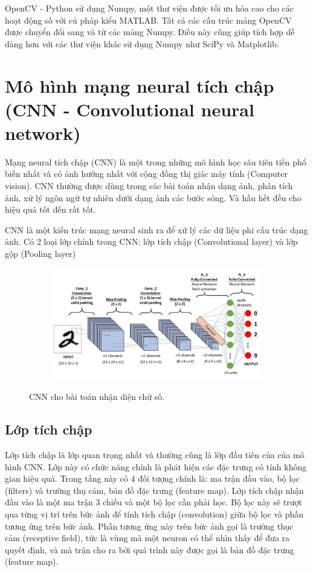 OpenCV - Python sử dụng Numpy, một thư viện được tối ưu hóa cao cho các hoạt động số với
cú pháp kiểu MATLAB. Tất cả các cấu trúc mảng OpenCV được chuyển đổi sang và từ các mảng
Numpy. Điều này cũng giúp tích hợp dễ dàng hơn với các thư viện khác sử dụng Numpy
như SciPy và Matplotlib.



\section{Mô hình mạng neural tích chập (CNN - Convolutional neural network)}

Mạng neural tích chập (CNN) là một trong những mô hình học sâu\cite{repec} tiên tiến phổ biến nhất và
có ảnh hưởng nhất với cộng đồng thị giác máy tính (Computer vision). CNN thường được dùng
trong các bài toán nhận dạng ảnh, phân tích ảnh, xử lý ngôn ngữ tự nhiên dưới dạng ảnh các bước sóng.
Và hầu hết đều cho hiệu quả tốt đến rất tốt.

CNN là một kiến trúc mạng neural sinh ra để xử lý các dữ liệu phi cấu trúc dạng ảnh. Có 2 loại lớp
chính trong CNN: lớp tích chập (Convolutional layer) và lớp gộp (Pooling layer)

\begin{figure}
    \begin{subfigure}{1.\textwidth}
        \includegraphics[width=1.\linewidth]{Chapters/items/cnn2_1.jpg}
        \label{fig: chap2_2}
    \end{subfigure}
    \caption{CNN cho bài toán nhận diện chữ số.}
\end{figure}
\subsection{Lớp tích chập}

Lớp tích chập là lớp quan trọng nhất và thường cũng là lớp đầu tiên của của mô hình CNN.
Lớp này có chức năng chính là phát hiện các đặc trưng có tính không gian hiệu quả.
Trong tầng này có 4 đối tượng chính là: ma trận đầu vào, bộ lọc (filters) và trường thụ cảm,
bản đồ đặc trưng (feature map). Lớp tích chập nhận đầu vào là một ma trận 3 chiều và một bộ lọc cần phải học.
Bộ lọc này sẽ trượt qua từng vị trí trên bức ảnh để tính tích chập (convolution)
giữa bộ lọc và phần tương ứng trên bức ảnh. Phần tương ứng này trên bức ảnh gọi là
trường thục cảm (receptive field), tức là vùng mà một neuron có thể nhìn thấy để đưa
ra quyết định, và mà trận cho ra bởi quá trình này được gọi là bản đồ đặc trưng (feature map).


